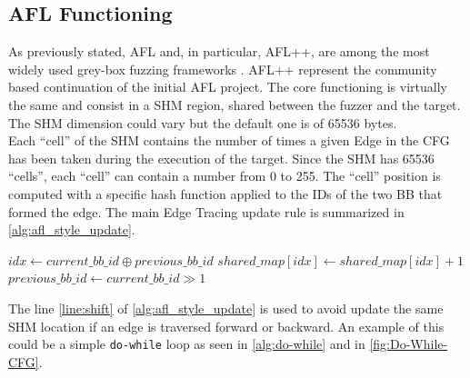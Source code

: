         \subsection{AFL Functioning} 
        \cite{afl_technical_details}
            As previously stated, AFL and, in particular, AFL++, are among the most widely used grey-box 
            fuzzing frameworks \cite{aflplusplus}.
            AFL++ represent the community based continuation of the initial AFL project.
            The core functioning is virtually the same and consist in a \gls{SHM} region, shared between the fuzzer and the target.
            The \gls{SHM} dimension could vary but the default one is of 65536 bytes.\\
            Each ``cell'' of the  \gls{SHM} contains the number of times a given Edge in the \gls{CFG} has been 
                taken during the execution of the target. Since the \gls{SHM} has 65536 ``cells'', each ``cell'' 
                can contain a number from 0 to 255.
            The ``cell'' position is computed with a specific hash function applied to the IDs of the two \gls{BB} 
            that formed the edge. 
            The main Edge Tracing update rule is summarized in \cref{alg:afl_style_update}. 
            \begin{algorithm}
                \caption{AFL Style SHM update rule}
                \label{alg:afl_style_update}
                \begin{algorithmic}[1]
                    \STATE $idx \gets current\_bb\_id \oplus previous\_bb\_id$ \label{line:xor}
                    \STATE $shared\_map[idx] \gets shared\_map[idx]+1$ \label{line:increment}
                    \STATE $previous\_bb\_id \gets current\_bb\_id \gg 1$ \label{line:shift}
                \end{algorithmic}
            \end{algorithm}
            The line \cref{line:shift} of \cref{alg:afl_style_update} is used to avoid update the same \gls{SHM} 
            location if an edge is traversed forward or backward.
            An example of this could be a simple \texttt{do-while} loop as seen in \cref{alg:do-while} and in \cref{fig:Do-While-CFG}.\\
